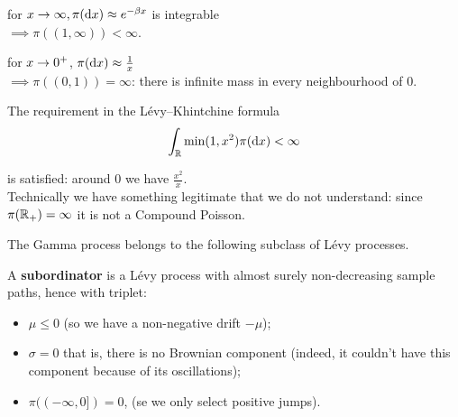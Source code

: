 \documentclass{article}
\begin{document}
	\begin{itemize}
		\begin{minipage}{0.5\textwidth}
			\item for $x \rightarrow \infty, \pi(\mathop{}\!\mathrm{d} x) \approx e^{-\beta x} $ is integrable \\$ \implies\pi((1,\infty)) < \infty$. 
		\end{minipage}
		\begin{minipage}{0.4\textwidth}
			\begin{figure}[H]
				\centering
				
			\end{figure}
		\end{minipage}\par
		\begin{minipage}{0.5\textwidth}
			\item for $x \rightarrow 0^+$, $\pi(\mathop{}\!\mathrm{d} x)  \approx \frac{1}{x}$ \\ $\implies \pi\left((0,1)\right)=\infty$: there is infinite mass in every neighbourhood of 0.
		\end{minipage}
		\begin{minipage}{0.4\textwidth}
			\begin{figure}[H]
				\centering
				
			\end{figure}
		\end{minipage}
	        The requirement in the L\'evy–Khintchine formula 
	\begin{equation*}
		\int_\mathbb{R} \min(1,x^2) \pi(\mathop{}\!\mathrm{d} x) < \infty
	\end{equation*}
	
	is satisfied: around $0$ we have $\frac{x^2}{x}$. \\
	Technically we have something legitimate that we do not understand:
	since $\pi(\mathbb{R}_+)=\infty$ it is not a Compound Poisson.\\  
	\end{itemize}
	The Gamma process belongs to the following subclass of L\'evy processes.
	\begin{definition}
		 A \textbf{subordinator} is a L\'evy process with almost surely non-decreasing sample paths, hence with triplet:
		\begin{itemize}
			\item $\mu \leq 0$ (so we have a non-negative drift $-\mu$);
			\item $\sigma = 0$ that is, there is no Brownian component (indeed, it couldn't have this component because of its oscillations); %
			\item $\pi((-\infty,0]) = 0$, (se we only select positive jumps). 
		\end{itemize}
	\end{definition}
\end{document}
